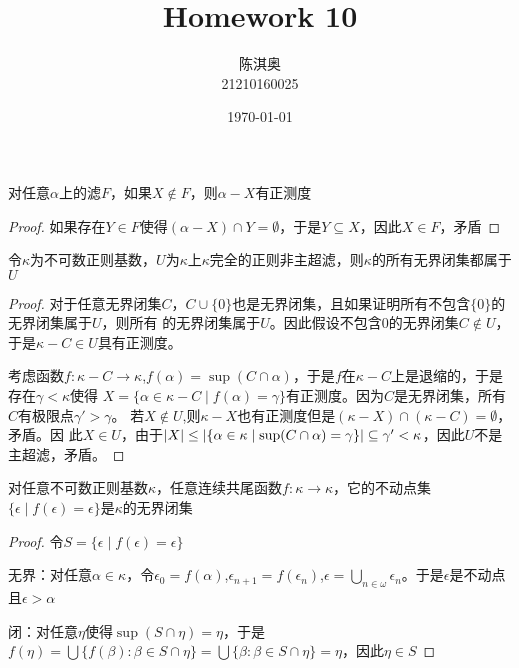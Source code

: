 \documentclass[11pt]{article}
\author{陈淇奥\\21210160025}
\date{\today}
\title{Homework 10}
\begin{document}
\maketitle
\begin{exercise}
对任意\(\alpha\)上的滤\(F\)，如果\(X\notin F\)，则\(\alpha-X\)有正测度
\end{exercise}

\begin{proof}
如果存在\(Y\in F\)使得\((\alpha-X)\cap Y=\emptyset\)，于是\(Y\subseteq X\)，因此\(X\in F\)，矛盾
\end{proof}

\begin{exercise}
令\(\kappa\)为不可数正则基数，\(U\)为\(\kappa\)上\(\kappa\)完全的正则非主超滤，则\(\kappa\)的所有无界闭集都属于\(U\)
\end{exercise}

\begin{proof}
对于任意无界闭集\(C\)，\(C\cup\{0\}\)也是无界闭集，且如果证明所有不包含\(\{0\}\)的无界闭集属于\(U\)，则所有
的无界闭集属于\(U\)。因此假设不包含0的无界闭集\(C\notin U\)，于是\(\kappa-C\in U\)具有正测度。

考虑函数\(f:\kappa-C\to\kappa\),\(f(\alpha)=\sup(C\cap\alpha)\)，于是\(f\)在\(\kappa-C\)上是退缩的，于是存在\(\gamma<\kappa\)使得
\(X=\{\alpha\in\kappa-C\mid f(\alpha)=\gamma\}\)有正测度。因为\(C\)是无界闭集，所有\(C\)有极限点\(\gamma'>\gamma\)。
若\(X\notin U\),则\(\kappa-X\)也有正测度但是\((\kappa-X)\cap(\kappa-C)=\emptyset\)，矛盾。因
此\(X\in U\)，由于\(\abs{X}\le\abs{\{\alpha\in\kappa\mid\sup(C\cap\alpha)=\gamma\}}\subseteq\gamma'<\kappa\)，因此\(U\)不是主超滤，矛盾。
\end{proof}

\begin{exercise}
对任意不可数正则基数\(\kappa\)，任意连续共尾函数\(f:\kappa\to\kappa\)，它的不动点集\(\{\epsilon\mid f(\epsilon)=\epsilon\}\)是\(\kappa\)的无界闭集
\end{exercise}

\begin{proof}
令\(S=\{\epsilon\mid f(\epsilon)=\epsilon\}\)

无界：对任意\(\alpha\in\kappa\)，令\(\epsilon_0=f(\alpha)\),\(\epsilon_{n+1}=f(\epsilon_n)\),\(\epsilon=\bigcup_{n\in\omega}\epsilon_n\)。于是\(\epsilon\)是不动点且\(\epsilon>\alpha\)

闭：对任意\(\eta\)使得\(\sup(S\cap\eta)=\eta\)，于是\(f(\eta)=\bigcup\{f(\beta):\beta\in S\cap\eta\}=\bigcup\{\beta:\beta\in S\cap\eta\}=\eta\)，因此\(\eta\in S\)
\end{proof}
\end{document}
